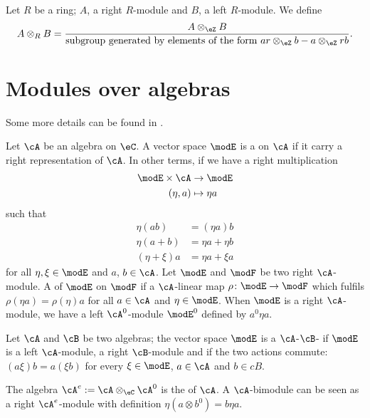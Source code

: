 Let $R$ be a ring; $A$, a right $R$-module and $B$, a left $R$-module. We define
\begin{equation}		\label{EqdefAtensRB}
	A\otimes_RB=\frac{ A\otimes_{\eZ}B }{\text{subgroup generated by elements of the form $ar\otimes_{\eZ}b-a\otimes_{\eZ}rb$}}.
\end{equation}

\section{Modules over algebras}

Some more details can be found in \cite{Landi}.


Let $\cA$ be an algebra on $\eC$. A vector space $\modE$ is a  on $\cA$ if it carry a right representation of $\cA$. In other terms, if we have a right multiplication 
\begin{equation}
\begin{aligned}
 \modE\times\cA&\to \modE \\ 
  (\eta,a)&\mapsto \eta a 
\end{aligned}
\end{equation}
such that
\begin{subequations}
\begin{align}
  \eta(ab)&=(\eta a)b\\
\eta(a+b)&=\eta a+\eta b\\
(\eta+\xi)a&=\eta a+\xi a
\end{align}
\end{subequations}
for all $\eta,\xi\in\modE$ and $a$, $b\in\cA$. Let $\modE$ and $\modF$ be two right $\cA$-module. A  of $\modE$ on $\modF$ if a $\cA$-linear map $\rho\colon \modE\to \modF$ which fulfils $\rho(\eta a)=\rho(\eta)a$ for all $a\in\cA$ and $\eta\in\modE$. When $\modE$ is a right $\cA$-module, we have a left $\cA^0$-module $\modE^0$ defined by $a^0\eta a$. 

Let $\cA$ and $\cB$ be two algebras; the vector space $\modE$ is a $\cA$-$\cB$- if $\modE$ is a left $\cA$-module, a right $\cB$-module and if the two actions commute: $(a\xi)b=a(\xi b)$ for every $\xi\in\modE$, $a\in\cA$ and $b\in cB$.

The algebra $\cA^e:=\cA\otimes_{\eC}\cA^0$ is the  of $\cA$. A $\cA$-bimodule can be seen as a right $\cA^e$-module with definition $\eta(a\otimes b^0)=b\eta a$.

